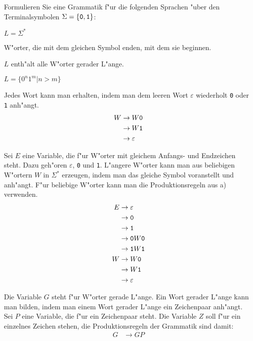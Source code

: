 Formulieren Sie eine Grammatik f"ur die folgenden Sprachen "uber
den Terminalsymbolen $\Sigma=\{{\tt 0},{\tt 1}\}$:
\begin{teilaufgaben}
\item $L=\Sigma^*$
\item W"orter, die mit dem gleichen Symbol enden, mit dem sie beginnen.
\item $L$ enth"alt alle W"orter gerader L"ange.
\item $L=\{0^n1^m|n>m\}$
\end{teilaufgaben}

\begin{loesung}
\begin{teilaufgaben}
\item
Jedes Wort kann man erhalten, indem man dem leeren Wort $\varepsilon$
wiederholt {\tt 0} oder {\tt 1} anh"angt.
\begin{align*}
W&\rightarrow W{\tt 0}\\
 &\rightarrow W{\tt 1}\\
 &\rightarrow\varepsilon
\end{align*}
\item Sei $E$ eine Variable, die f"ur W"orter mit gleichem Anfangs-
und Endzeichen steht. Dazu geh"oren $\varepsilon$, {\tt 0} und {\tt 1}.
L"angere
W"orter kann man aus beliebigen W"ortern $W$ in $\Sigma^*$ erzeugen,
indem man das gleiche Symbol voranstellt und anh"angt. F"ur beliebige
W"orter kann
man die Produktionsregeln aus a) verwenden.
\begin{align*}
E&\rightarrow \varepsilon\\
 &\rightarrow {\tt 0}\\
 &\rightarrow {\tt 1}\\
 &\rightarrow {\tt 0}W{\tt 0}\\
 &\rightarrow {\tt 1}W{\tt 1}\\
W&\rightarrow W{\tt 0}\\
 &\rightarrow W{\tt 1}\\
 &\rightarrow\varepsilon
\end{align*}
\item Die Variable $G$ steht f"ur W"orter gerade L"ange. Ein Wort
gerader L"ange kann man bilden, indem man einem Wort gerader L"ange
ein Zeichenpaar anh"angt. Sei $P$ eine Variable, die f"ur ein Zeichenpaar
steht. Die Variable $Z$ soll f"ur ein einzelnes Zeichen stehen, die
Produktionsregeln der Grammatik sind damit:
\begin{align*}
G&\rightarrow GP\\

\end{align*}
\end{teilaufgaben}
\end{loesung}
